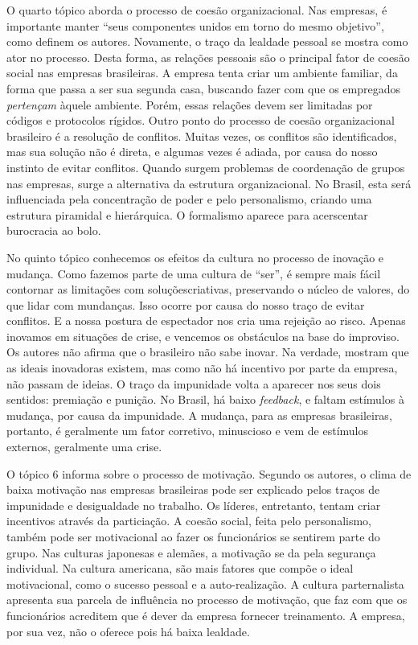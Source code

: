 \documentclass[11pt, a4paper]{article}
\begin{document}
O quarto tópico aborda o processo de coesão organizacional. Nas empresas, é importante manter ``seus componentes unidos em torno do mesmo objetivo'', como definem os autores. Novamente, o traço da lealdade pessoal se mostra como ator no processo. Desta forma, as relações pessoais são o principal fator de coesão social nas empresas brasileiras. A empresa tenta criar um ambiente familiar, da forma que passa a ser sua segunda casa, buscando fazer com que os empregados \emph{pertençam} àquele ambiente. Porém, essas relações devem ser limitadas por códigos e protocolos rígidos. Outro ponto do processo de coesão organizacional brasileiro é a resolução de conflitos. Muitas vezes, os conflitos são identificados, mas sua solução não é direta, e algumas vezes é adiada, por causa do nosso instinto de evitar conflitos. Quando surgem problemas de coordenação de grupos nas empresas, surge a alternativa da estrutura organizacional. No Brasil, esta será influenciada pela concentração de poder e pelo personalismo, criando uma estrutura piramidal e hierárquica. O formalismo aparece para acerscentar burocracia ao bolo.

No quinto tópico conhecemos os efeitos da cultura no processo de inovação e mudança. Como fazemos parte de uma cultura de ``ser'', é sempre mais fácil contornar as limitações com soluçõescriativas, preservando o núcleo de valores, do que lidar com mundanças. Isso ocorre por causa do nosso traço de evitar conflitos. E a nossa postura de espectador nos cria uma rejeição ao risco. Apenas inovamos em situações de crise, e vencemos os obstáculos na base do improviso. Os autores não afirma que o brasileiro não sabe inovar. Na verdade, mostram que as ideais inovadoras existem, mas como não há incentivo por parte da empresa, não passam de ideias. O traço da impunidade volta a aparecer nos seus dois sentidos: premiação e punição. No Brasil, há baixo \emph{feedback}, e faltam estímulos à mudança, por causa da impunidade. A mudança, para as empresas brasileiras, portanto, é geralmente um fator corretivo, minuscioso e vem de estímulos externos, geralmente uma crise.

O tópico 6 informa sobre o processo de motivação. Segundo os autores, o clima de baixa motivação nas empresas brasileiras pode ser explicado pelos traços de impunidade e desigualdade no trabalho. Os líderes, entretanto, tentam criar incentivos através da particiação. A coesão social, feita pelo personalismo, também pode ser motivacional ao fazer os funcionários se sentirem parte do grupo. Nas culturas japonesas e alemães, a motivação se da pela segurança individual. Na cultura americana, são mais fatores que compõe o ideal motivacional, como o sucesso pessoal e a auto-realização. A cultura parternalista apresenta sua parcela de influência no processo de motivação, que faz com que os funcionários acreditem que é dever da empresa fornecer treinamento. A empresa, por sua vez, não o oferece pois há baixa lealdade. 
\end{document}
